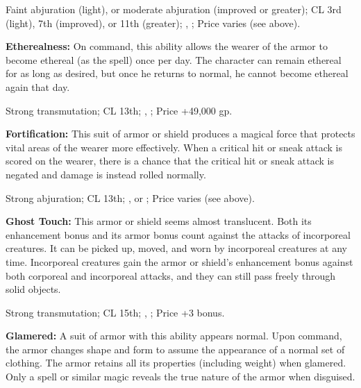 Faint abjuration (light), or moderate abjuration (improved or greater); CL 3rd (light), 7th (improved), or 11th (greater); , ; Price varies (see above).

\textbf{Etherealness:} On command, this ability allows the wearer of the armor to become ethereal (as the  spell) once per day. The character can remain ethereal for as long as desired, but once he returns to normal, he cannot become ethereal again that day.

Strong transmutation; CL 13th; , ; Price +49,000 gp. 

\textbf{Fortification:} This suit of armor or shield produces a magical force that protects vital areas of the wearer more effectively. When a critical hit or sneak attack is scored on the wearer, there is a chance that the critical hit or sneak attack is negated and damage is instead rolled normally.


Strong abjuration; CL 13th; ,  or ; Price varies (see above).

\textbf{Ghost Touch:} This armor or shield seems almost translucent. Both its enhancement bonus and its armor bonus count against the attacks of incorporeal creatures. It can be picked up, moved, and worn by incorporeal creatures at any time. Incorporeal creatures gain the armor or shield's enhancement bonus against both corporeal and incorporeal attacks, and they can still pass freely through solid objects.

Strong transmutation; CL 15th; , ; Price +3 bonus.

\textbf{Glamered:} A suit of armor with this ability appears normal. Upon command, the armor changes shape and form to assume the appearance of a normal set of clothing. The armor retains all its properties (including weight) when glamered. Only a  spell or similar magic reveals the true nature of the armor when disguised.

